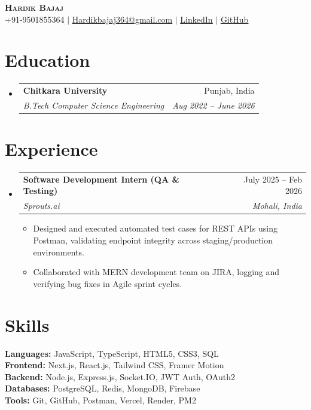 \documentclass[letterpaper,10pt]{article}
\makeatletter
\newcommand{\resumeItem}[1]{
  \item\tiny{{#1 \vspace{-3pt}}}
}
\newcommand{\resumeSubheading}[4]{
  \vspace{-3pt}\item
    \begin{tabular*}{0.97\textwidth}[t]{l@{\extracolsep{\fill}}r}
      \textbf{\small#1} & {\tiny #2} \\
      \textit{\tiny#3} & \textit{\tiny #4} \\
    \end{tabular*}\vspace{-7pt}
}
\newcommand{\resumeSubHeadingListStart}{\begin{itemize}[leftmargin=0.12in, label={}]}
\newcommand{\resumeSubHeadingListEnd}{\end{itemize}}
\newcommand{\resumeItemListStart}{\begin{itemize}[leftmargin=0.15in]}
\newcommand{\resumeItemListEnd}{\end{itemize}\vspace{-5pt}}
\makeatother
\begin{document}
\begin{center}
    \textbf{\Large \scshape Hardik Bajaj} \\ \vspace{2pt}
    \tiny +91-9501855364 $|$
    \href{mailto:Hardikbajaj364@gmail.com}{\underline{Hardikbajaj364@gmail.com}} $|$
    \href{https://www.linkedin.com/in/hardikbajaj364}{\underline{LinkedIn}} $|$
    \href{https://github.com/Hardik364}{\underline{GitHub}}
\end{center}

\section{Education}
  \resumeSubHeadingListStart
    \resumeSubheading
      {Chitkara University}{Punjab, India}
      {B.Tech Computer Science Engineering}{Aug 2022 -- June 2026}
  \resumeSubHeadingListEnd

\section{Experience}
  \resumeSubHeadingListStart
    \resumeSubheading
      {Software Development Intern (QA \& Testing)}{July 2025 -- Feb 2026}
      {Sprouts.ai}{Mohali, India}
      \resumeItemListStart
        \resumeItem{Designed and executed automated test cases for REST APIs using Postman, validating endpoint integrity across staging/production environments.}
        \resumeItem{Collaborated with MERN development team on JIRA, logging and verifying bug fixes in Agile sprint cycles.}
      \resumeItemListEnd
  \resumeSubHeadingListEnd

\section{Skills}
\begin{itemize}[leftmargin=0.12in, label={}]
    \tiny{\item{
        \textbf{Languages:} JavaScript, TypeScript, HTML5, CSS3, SQL \\
        \textbf{Frontend:} Next.js, React.js, Tailwind CSS, Framer Motion \\
        \textbf{Backend:} Node.js, Express.js, Socket.IO, JWT Auth, OAuth2 \\
        \textbf{Databases:} PostgreSQL, Redis, MongoDB, Firebase \\
        \textbf{Tools:} Git, GitHub, Postman, Vercel, Render, PM2
    }}
\end{itemize}
\end{document}
